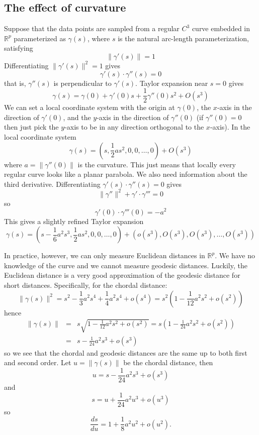 \subsection{The effect of curvature}
Suppose that the data points are sampled from a regular $C^3$ curve embedded in $\mathbb{R}^p$ parameterized as $\gamma(s)$, where $s$ is the natural arc-length parameterization, satisfying
$$\|\gamma'(s)\|=1$$
Differentiating $\|\gamma'(s)\|^2=1$ gives
$$\gamma'(s)\cdot \gamma''(s) = 0$$
that is, $\gamma''(s)$ is perpendicular to $\gamma'(s)$. Taylor expansion near $s=0$ gives
$$\gamma(s) = \gamma(0) + \gamma'(0)s + \frac{1}{2}\gamma''(0)s^2 + O(s^3)$$
We can set a local coordinate system with the origin at $\gamma(0)$, the $x$-axis in the direction of $\gamma'(0)$, and the $y$-axis in the direction of $\gamma''(0)$ (if $\gamma''(0)=0$ then just pick the $y$-axis to be in any direction orthogonal to the $x$-axis). In the local coordinate system
$$\gamma(s) = (s, \frac{1}{2}as^2, 0, 0, \ldots, 0) + O(s^3)$$
where $a = \|\gamma''(0)\|$ is the curvature. This just means that locally every regular curve looks like a planar parabola. We also need information about the third derivative. Differentiating $\gamma'(s)\cdot \gamma''(s) = 0$ gives
$$\|\gamma''\|^2 + \gamma' \cdot \gamma''' = 0$$
so
$$\gamma'(0) \cdot \gamma'''(0) = -a^2$$
This gives a slightly refined Taylor expansion
$$\gamma(s) = (s - \frac{1}{6}a^2 s^3, \frac{1}{2}as^2, 0, 0, \ldots, 0) + (o(s^3),O(s^3),O(s^3),\ldots,O(s^3))$$

In practice, however, we can only measure Euclidean distances in $\mathbb{R}^p$. We have no knowledge of the curve and we cannot measure geodesic distances.
Luckily, the Euclidean distance is a very good approximation of the geodesic distance for short distances. Specifically, for the chordal distance:
$$\|\gamma(s)\|^2 = s^2 - \frac{1}{3}a^2 s^4 + \frac{1}{4}a^2 s^4 + o(s^4) = s^2(1 - \frac{1}{12}a^2 s^2 + o(s^2))$$
hence
\begin{eqnarray}
\|\gamma(s)\| &=& s\sqrt{1 - \frac{1}{12}a^2 s^2 + o(s^2)} = s(1 - \frac{1}{24}a^2 s^2 + o(s^2)) \nonumber \\
&=& s-\frac{1}{24}a^2 s^3+o(s^3) \label{eq:u}
\end{eqnarray}
so we see that the chordal and geodesic distances are the same up to both first and second order.
Let $u=\|\gamma(s)\|$ be the chordal distance, then
$$u = s - \frac{1}{24}a^2 s^3+o(s^3)$$
and
$$s = u + \frac{1}{24}a^2 u^3+o(u^3)$$
so
$$\frac{ds}{du} = 1 + \frac{1}{8}a^2 u^2 + o(u^2).$$

